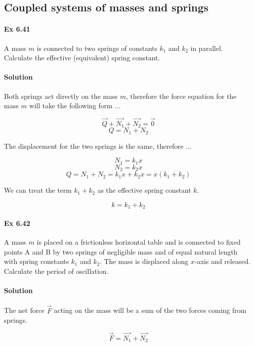 \documentclass{article}
\begin{document}
\subsection{Coupled systems of masses and springs}


\paragraph{Ex 6.41}
A mass $m$ is connected to two springs of constants $k_{1}$ and $k_{2}$ in parallel. Calculate the effective (equivalent) spring constant.
\paragraph{Solution}

Both springs act directly on the mass $m$, therefore the force equation for the mass $m$ will take the following form ...

\[ \vec{Q} + \vec{N_{1}} + \vec{N_{2}} = \vec{0} \]
\[ Q = N_{1} + N_{2} \]

The displacement for the two springs is the same, therefore ...

\[ N_{1} = k_{1}x \]
\[ N_{2} = k_{2}x \]
\[ Q = N_{1} + N_{2} = k_{1}x + k_{2}x = x (k_{1} + k_{2}) \]

We can treat the term $k_{1} + k_{2}$ as the effective spring constant $k$.

\[ k = k_{1} + k_{2} \]


\paragraph{Ex 6.42}
A mass $m$ is placed on a frictionless horizontal table and is connected to fixed points A and B by two springs of negligible mass and of equal natural length with spring constants $k_{1}$ and $k_{2}$. The mass is displaced along $x$-axis and released. Calculate the period of oscillation.
\paragraph{Solution}

The net force $\vec{F}$ acting on the mass will be a sum of the two forces coming from springs.

\[ \vec{F} = \vec{N_{1}} + \vec{N_{2}} \]
\end{document}
